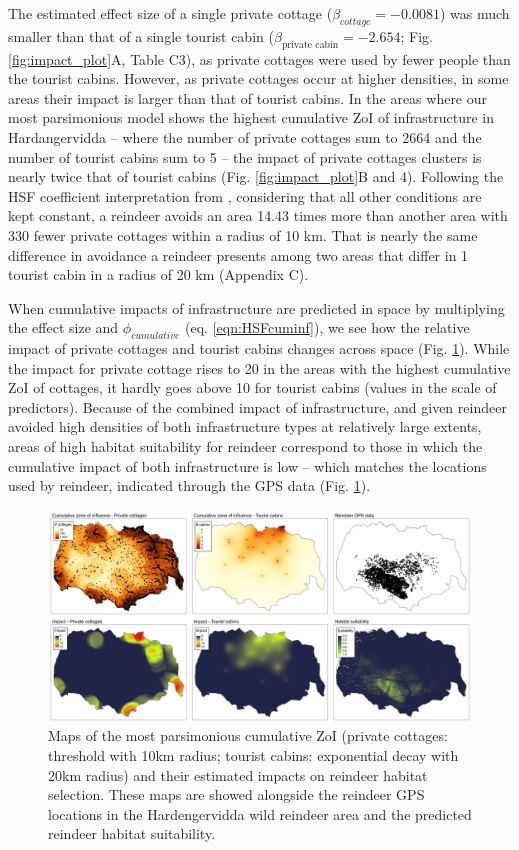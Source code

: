 \documentclass[titlepage]{article}
\begin{document}
The estimated effect size of a single private
cottage ($\beta_{cottage} = -0.0081$) was much smaller than that of a single tourist cabin
($\beta_{\text{private cabin}} = -2.654$; Fig. \ref{fig:impact_plot}A, Table C3), as
private cottages were used by fewer people than the tourist cabins. However, as
private cottages occur at higher densities, in some areas their impact 
is larger than that of tourist cabins. In the areas where our most parsimonious model shows the 
highest cumulative ZoI of infrastructure in Hardangervidda -- where the number of private cottages sum to 2664
and the number of tourist cabins sum to 5 -- the impact of 
private cottages clusters is nearly twice that of tourist cabins
(Fig. \ref{fig:impact_plot}B and 4). Following the HSF coefficient interpretation from \citet{fieberg_how_2021}, considering that all other conditions are kept constant, a reindeer avoids an area 14.43 times more than another area with
330 fewer private cottages within a radius of 10 km. That is nearly the same difference in avoidance a reindeer presents among two areas that differ in 1 tourist cabin in a radius of 20 km (Appendix C).

When cumulative impacts of infrastructure are predicted in space by multiplying the effect size and $\phi_{cumulative}$ (eq. \ref{eqn:HSFcuminf}), we see how the relative impact of private cottages and tourist cabins changes across space (Fig. \ref{fig:prediction_maps}). While the impact for private cottage rises to 20 in the areas with the highest cumulative ZoI of cottages, it hardly goes above 10 for tourist cabins (values in the scale of predictors). Because of the combined impact of infrastructure, and given reindeer
avoided high densities of both infrastructure types at relatively large extents, 
areas of high habitat suitability for reindeer correspond to those in which the
cumulative impact of both infrastructure is low -- which matches the
locations used by reindeer, indicated through the GPS data (Fig. \ref{fig:prediction_maps}).

\begin{figure}[h]
\centering
\includegraphics[width=1.3\textwidth,center]{figures/reindeer_results_prediction_maps.png}
\caption{\label{fig:prediction_maps} Maps of the most parsimonious cumulative ZoI (private cottages: threshold with 10km radius; tourist cabins: exponential decay with 20km radius) and their estimated impacts on reindeer habitat selection. These maps are showed alongside the reindeer GPS locations in the Hardengervidda wild reindeer area and the predicted reindeer habitat suitability.}
\end{figure}
\end{document}
